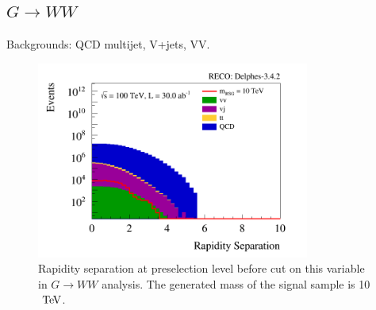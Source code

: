 \documentclass{cernrep}
\begin{document}
\subsection{$G \rightarrow WW$}
\label{subsec:RSGww}

Backgrounds: QCD multijet, V+jets, VV.

\begin{figure}[!htb]\centering
\includegraphics[width=0.8\textwidth]{Fig/RSGww/rapiditySeparation_sel0_nostack_log.png}
\caption{Rapidity separation at preselection level before cut on this variable in $G \rightarrow WW$ analysis. The generated mass of the signal sample is 10 $\TeV$.}
\label{fig:RSGww_sel0_rapidity}
\end{figure}
\end{document}
